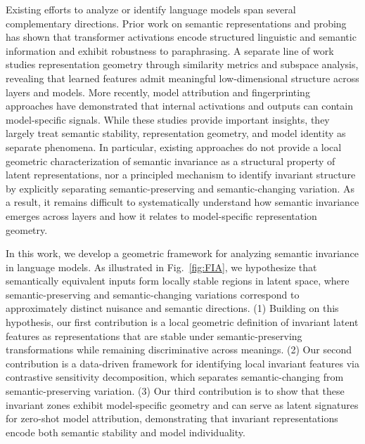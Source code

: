 Existing efforts to analyze or identify language models span several complementary directions. Prior work on semantic representations and probing has shown that transformer activations encode structured linguistic and semantic information and exhibit robustness to paraphrasing. A separate line of work studies representation geometry through similarity metrics and subspace analysis, revealing that learned features admit meaningful low-dimensional structure across layers and models. More recently, model attribution and fingerprinting approaches have demonstrated that internal activations and outputs can contain model-specific signals. 
While these studies provide important insights, they largely treat semantic stability, representation geometry, and model identity as separate phenomena. In particular, existing approaches do not provide a local geometric characterization of semantic invariance as a structural property of latent representations, nor a principled mechanism to identify invariant structure by explicitly separating semantic-preserving and semantic-changing variation. As a result, it remains difficult to systematically understand how semantic invariance emerges across layers and how it relates to model-specific representation geometry.

In this work, we develop a geometric framework for analyzing semantic invariance in language models. As illustrated in Fig.~\ref{fig:FIA}, we hypothesize that semantically equivalent inputs form locally stable regions in latent space, where semantic-preserving and semantic-changing variations correspond to approximately distinct nuisance and semantic directions. 
(1) Building on this hypothesis, our first contribution is a local geometric definition of invariant latent features as representations that are stable under semantic-preserving transformations while remaining discriminative across meanings. 
(2) Our second contribution is a data-driven framework for identifying local invariant features via contrastive sensitivity decomposition, which separates semantic-changing from semantic-preserving variation.
(3) Our third contribution is to show that these invariant zones exhibit model-specific geometry and can serve as latent signatures for zero-shot model attribution, demonstrating that invariant representations encode both semantic stability and model individuality. 

